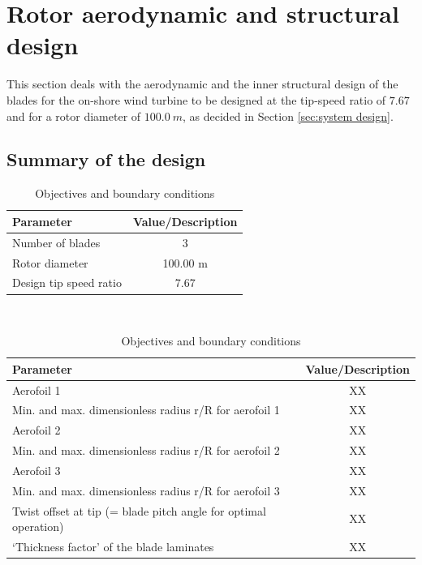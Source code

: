 \section{Rotor aerodynamic and structural design} \label{sec:rotor design}
This section deals with the aerodynamic and the inner structural design of the blades for the on-shore wind turbine to be designed at the tip-speed ratio of $7.67$ and for a rotor diameter of $100.0\ m$, as decided in Section \ref{sec:system design}.

\subsection{Summary of the design}

\begin{table}[H]
\begin{center} 
\caption{Objectives and boundary conditions}\label{tab:rotordesign1}
\begin{tabular}{ |l|c| } 
\hline
\textbf{Parameter} & \textbf{Value/Description}  \\ 
\hline
Number of blades & 3  \\ 
\hline
Rotor diameter & 100.00 m \\ 
\hline
Design tip speed ratio & 7.67 \\
\hline
\end{tabular} \\
\end{center}
\end{table}

\begin{table}[H]
\begin{center} 
\caption{Objectives and boundary conditions}\label{tab:rotordesign2}
\begin{tabular}{ |l|c| } 
\hline
\textbf{Parameter} & \textbf{Value/Description}  \\ 
\hline
Aerofoil 1 & XX  \\ 
\hline
Min. and max. dimensionless radius r/R for aerofoil 1 & XX \\ 
\hline
Aerofoil 2 & XX \\
\hline
Min. and max. dimensionless radius r/R for aerofoil 2 & XX \\
\hline
Aerofoil 3 & XX \\
\hline
Min. and max. dimensionless radius r/R for aerofoil 3 & XX \\
\hline
Twist offset at tip (= blade pitch angle for optimal operation) & XX \\
\hline
‘Thickness factor’ of the blade laminates & XX \\
\hline
\end{tabular} \\
\end{center}
\end{table}

